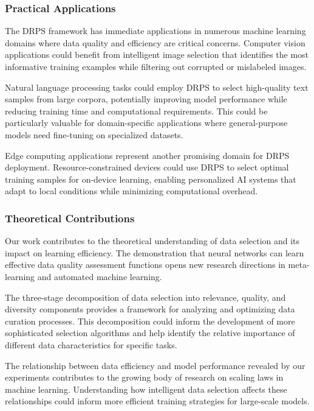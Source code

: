 \documentclass[12pt]{article}
\begin{document}
\subsubsection{Practical Applications}\label{practical-applications}

The DRPS framework has immediate applications in numerous machine learning domains where data quality and efficiency are critical concerns. Computer vision applications could benefit from intelligent image selection that identifies the most informative training examples while filtering out corrupted or mislabeled images.

Natural language processing tasks could employ DRPS to select high-quality text samples from large corpora, potentially improving model performance while reducing training time and computational requirements. This could be particularly valuable for domain-specific applications where general-purpose models need fine-tuning on specialized datasets.

Edge computing applications represent another promising domain for DRPS deployment. Resource-constrained devices could use DRPS to select optimal training samples for on-device learning, enabling personalized AI systems that adapt to local conditions while minimizing computational overhead.

\subsubsection{Theoretical Contributions}\label{theoretical-contributions}

Our work contributes to the theoretical understanding of data selection and its impact on learning efficiency. The demonstration that neural networks can learn effective data quality assessment functions opens new research directions in meta-learning and automated machine learning.

The three-stage decomposition of data selection into relevance, quality, and diversity components provides a framework for analyzing and optimizing data curation processes. This decomposition could inform the development of more sophisticated selection algorithms and help identify the relative importance of different data characteristics for specific tasks.

The relationship between data efficiency and model performance revealed by our experiments contributes to the growing body of research on scaling laws in machine learning. Understanding how intelligent data selection affects these relationships could inform more efficient training strategies for large-scale models.
\end{document}

